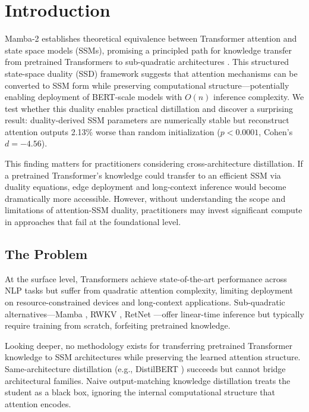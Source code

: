 \section{Introduction}
\label{sec:introduction}

Mamba-2 establishes theoretical equivalence between Transformer attention and state space models (SSMs), promising a principled path for knowledge transfer from pretrained Transformers to sub-quadratic architectures \citep{dao2024mamba2}. This structured state-space duality (SSD) framework suggests that attention mechanisms can be converted to SSM form while preserving computational structure---potentially enabling deployment of BERT-scale models with $O(n)$ inference complexity. We test whether this duality enables practical distillation and discover a surprising result: duality-derived SSM parameters are numerically stable but reconstruct attention outputs 2.13\% worse than random initialization ($p < 0.0001$, Cohen's $d = -4.56$).

This finding matters for practitioners considering cross-architecture distillation. If a pretrained Transformer's knowledge could transfer to an efficient SSM via duality equations, edge deployment and long-context inference would become dramatically more accessible. However, without understanding the scope and limitations of attention-SSM duality, practitioners may invest significant compute in approaches that fail at the foundational level.

\subsection{The Problem}

At the surface level, Transformers achieve state-of-the-art performance across NLP tasks but suffer from quadratic attention complexity, limiting deployment on resource-constrained devices and long-context applications. Sub-quadratic alternatives---Mamba \citep{gu2023mamba}, RWKV \citep{peng2023rwkv}, RetNet \citep{sun2023retnet}---offer linear-time inference but typically require training from scratch, forfeiting pretrained knowledge.

Looking deeper, no methodology exists for transferring pretrained Transformer knowledge to SSM architectures while preserving the learned attention structure. Same-architecture distillation (e.g., DistilBERT \citep{sanh2019distilbert}) succeeds but cannot bridge architectural families. Naive output-matching knowledge distillation treats the student as a black box, ignoring the internal computational structure that attention encodes.

